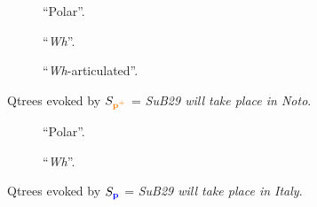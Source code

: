 \begin{figure}[H]
	\centering
	\begin{subfigure}[b]{.2\linewidth}
		\centering
		\caption[]{``Polar''.}\label{fig6:qtree-noto-polar}
	\end{subfigure}\hfill
	\begin{subfigure}[b]{.37\linewidth}
		\centering
		\caption[]{``\textit{Wh}''.}\label{fig6:qtree-noto-wh}
	\end{subfigure}\hfill
	\begin{subfigure}[b]{.37\linewidth}
		\centering
		\caption[]{``\textit{Wh}-articulated''.}\label{fig6:qtree-noto-tiered}
	\end{subfigure}
	\caption[]{Qtrees evoked by $S_{\textbf{\textcolor{orange}{p$^+$}}}$ = \textit{SuB29 will take place in Noto}.}\label{fig6:qtrees-noto}
\end{figure}
\begin{figure}[H]
	\centering
	
	\begin{subfigure}[b]{.45\linewidth}
		\centering
		\caption[]{``Polar''.}\label{fig6:qtree-italy-polar}
	\end{subfigure}\hfill
	\begin{subfigure}[b]{.45\linewidth}
		\centering
		\caption[]{``\textit{Wh}''.}\label{fig6:qtree-italy-wh}
	\end{subfigure}
	\caption[]{Qtrees evoked by $S_{\textbf{\textcolor{blue}{p}}}$ = \textit{SuB29 will take place in Italy}.}\label{fig6:qtrees-italy}
\end{figure}

